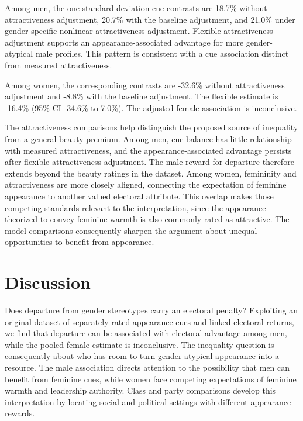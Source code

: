 \documentclass[11pt,a4paper]{article}\usepackage[]{graphicx}\usepackage[]{xcolor}
\begin{document}
Among men, the one-standard-deviation cue contrasts are 18.7\% without attractiveness adjustment, 20.7\% with the baseline adjustment, and 21.0\% under gender-specific nonlinear attractiveness adjustment. Flexible attractiveness adjustment supports an appearance-associated advantage for more gender-atypical male profiles. This pattern is consistent with a cue association distinct from measured attractiveness.

Among women, the corresponding contrasts are -32.6\% without attractiveness adjustment and -8.8\% with the baseline adjustment. The flexible estimate is -16.4\% (95\% CI -34.6\% to 7.0\%). The adjusted female association is inconclusive.

The attractiveness comparisons help distinguish the proposed source of inequality from a general beauty premium. Among men, cue balance has little relationship with measured attractiveness, and the appearance-associated advantage persists after flexible attractiveness adjustment. The male reward for departure therefore extends beyond the beauty ratings in the dataset. Among women, femininity and attractiveness are more closely aligned, connecting the expectation of feminine appearance to another valued electoral attribute. This overlap makes those competing standards relevant to the interpretation, since the appearance theorized to convey feminine warmth is also commonly rated as attractive. The model comparisons consequently sharpen the argument about unequal opportunities to benefit from appearance.

\section{Discussion}
\label{sec:discussion}
Does departure from gender stereotypes carry an electoral penalty? Exploiting an original dataset of separately rated appearance cues and linked electoral returns, we find that departure can be associated with electoral advantage among men, while the pooled female estimate is inconclusive. The inequality question is consequently about who has room to turn gender-atypical appearance into a resource. The male association directs attention to the possibility that men can benefit from feminine cues, while women face competing expectations of feminine warmth and leadership authority. Class and party comparisons develop this interpretation by locating social and political settings with different appearance rewards.
\end{document}
